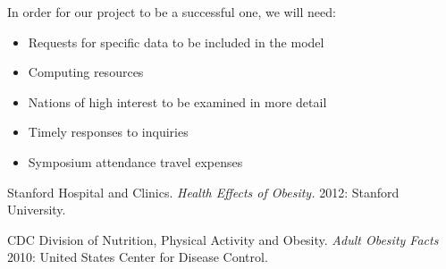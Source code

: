 \documentclass[12pt,letterpaper]{article}
\theoremstyle{definition}
\begin{document}
In order for our project to be a successful one, we will need:
\begin{itemize}
    \item Requests for specific data to be included in the model
    \item Computing resources
    \item Nations of high interest to be examined in more detail
    \item Timely responses to inquiries
    \item Symposium attendance travel expenses
\end{itemize}


\newpage

 \begin{thebibliography}{1}

   Stanford Hospital and Clinics. {\em Health Effects of Obesity.}  2012: Stanford University.

    CDC Division of Nutrition, Physical Activity and Obesity. {\em Adult Obesity Facts} 2010:
  United States Center for Disease Control.

  \end{thebibliography}
\end{document}
